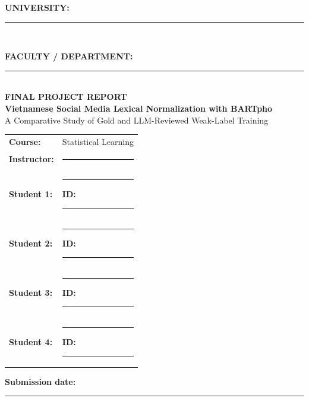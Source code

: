\documentclass[11pt]{article}
\begin{document}
\begin{titlepage}
\thispagestyle{empty}
\begin{center}
{\large \textbf{UNIVERSITY:} \rule{8cm}{0.4pt}}\\[1em]
{\large \textbf{FACULTY / DEPARTMENT:} \rule{6cm}{0.4pt}}\\[3em]
{\Large \textbf{FINAL PROJECT REPORT}}\\[2em]
{\LARGE \textbf{Vietnamese Social Media Lexical Normalization with BARTpho}}\\[1em]
{\large A Comparative Study of Gold and LLM-Reviewed Weak-Label Training}\\[3em]
\begin{tabular}{ll}
\textbf{Course:} & Statistical Learning \\[1em]
\textbf{Instructor:} & \rule{8cm}{0.4pt} \\[2em]
\textbf{Student 1:} & \rule{5cm}{0.4pt}\quad \textbf{ID:} \rule{3cm}{0.4pt} \\[1em]
\textbf{Student 2:} & \rule{5cm}{0.4pt}\quad \textbf{ID:} \rule{3cm}{0.4pt} \\[1em]
\textbf{Student 3:} & \rule{5cm}{0.4pt}\quad \textbf{ID:} \rule{3cm}{0.4pt} \\[1em]
\textbf{Student 4:} & \rule{5cm}{0.4pt}\quad \textbf{ID:} \rule{3cm}{0.4pt}
\end{tabular}
\vfill
\textbf{Submission date:} \rule{5cm}{0.4pt}
\end{center}
\end{titlepage}
\setcounter{page}{1}

\begin{abstract}
Vietnamese social media text frequently contains abbreviations, informal spellings, omitted diacritics, and other non-standard lexical forms. This study formulates their normalization as a sequence-to-sequence task and compares three BARTpho-syllable configurations. Model~A was fine-tuned on 8,372 human-annotated ViLexNorm training pairs. Model~B was initialized from Model~A and trained with a balanced mixture of gold data and an initial pool of 18,970 LLM-reviewed weak labels. Model~C was also initialized from Model~A but used an expanded pool of 64,813 LLM-reviewed weak labels. Candidate normalizations for ViSoLex were reviewed by Gemini under a \textsc{Keep}, \textsc{Edit}, or \textsc{Reject} protocol and then subjected to deterministic validation. A common Dev evaluation selected Model~C before final Test scoring. On the 1,045-sentence ViLexNorm Test split, Models~A, B, and C obtained F1 scores of 0.7182, 0.7422, and 0.7650, and Error Reduction Rates of 0.6002, 0.6331, and 0.6647, respectively. A later three-seed factorial follow-up identified L8 as strongest under its frozen Dev-loss selection protocol; a maximum-20-epoch run remained exploratory. Model~C is the local Gradio default and Model~B the fallback. The application performs BARTpho inference locally and does not use the review model at runtime.
\end{abstract}
\end{document}
